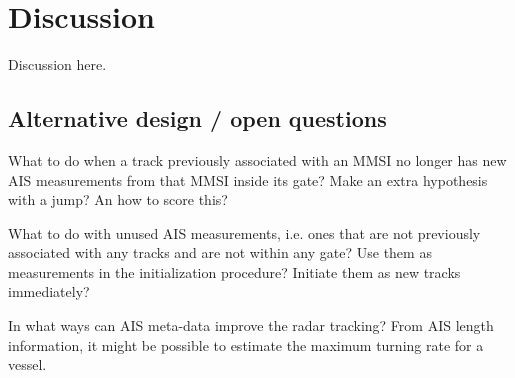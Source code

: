 
\chapter{Discussion}\label{chapter:discussion}
Discussion here.

\section{Alternative design / open questions}
What to do when a track previously associated with an MMSI no longer has new AIS measurements from that MMSI inside its gate? Make an extra hypothesis with a jump? An how to score this?

What to do with unused AIS measurements, i.e. ones that are not previously associated with any tracks and are not within any gate? Use them as measurements in the initialization procedure? Initiate them as new tracks immediately?

In what ways can AIS meta-data improve the radar tracking? From AIS length information, it might be possible to estimate the maximum turning rate for a vessel.
